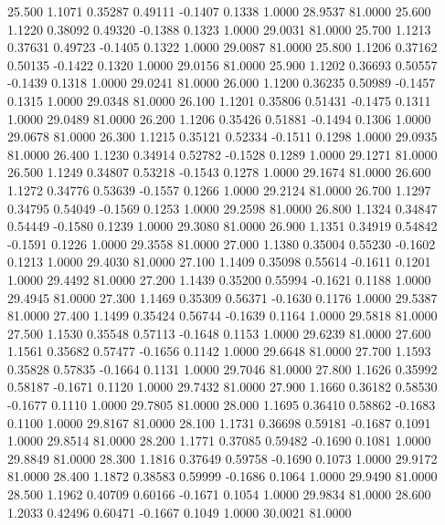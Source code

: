   25.500   1.1071   0.35287   0.49111  -0.1407   0.1338   1.0000  28.9537  81.0000
  25.600   1.1220   0.38092   0.49320  -0.1388   0.1323   1.0000  29.0031  81.0000
  25.700   1.1213   0.37631   0.49723  -0.1405   0.1322   1.0000  29.0087  81.0000
  25.800   1.1206   0.37162   0.50135  -0.1422   0.1320   1.0000  29.0156  81.0000
  25.900   1.1202   0.36693   0.50557  -0.1439   0.1318   1.0000  29.0241  81.0000
  26.000   1.1200   0.36235   0.50989  -0.1457   0.1315   1.0000  29.0348  81.0000
  26.100   1.1201   0.35806   0.51431  -0.1475   0.1311   1.0000  29.0489  81.0000
  26.200   1.1206   0.35426   0.51881  -0.1494   0.1306   1.0000  29.0678  81.0000
  26.300   1.1215   0.35121   0.52334  -0.1511   0.1298   1.0000  29.0935  81.0000
  26.400   1.1230   0.34914   0.52782  -0.1528   0.1289   1.0000  29.1271  81.0000
  26.500   1.1249   0.34807   0.53218  -0.1543   0.1278   1.0000  29.1674  81.0000
  26.600   1.1272   0.34776   0.53639  -0.1557   0.1266   1.0000  29.2124  81.0000
  26.700   1.1297   0.34795   0.54049  -0.1569   0.1253   1.0000  29.2598  81.0000
  26.800   1.1324   0.34847   0.54449  -0.1580   0.1239   1.0000  29.3080  81.0000
  26.900   1.1351   0.34919   0.54842  -0.1591   0.1226   1.0000  29.3558  81.0000
  27.000   1.1380   0.35004   0.55230  -0.1602   0.1213   1.0000  29.4030  81.0000
  27.100   1.1409   0.35098   0.55614  -0.1611   0.1201   1.0000  29.4492  81.0000
  27.200   1.1439   0.35200   0.55994  -0.1621   0.1188   1.0000  29.4945  81.0000
  27.300   1.1469   0.35309   0.56371  -0.1630   0.1176   1.0000  29.5387  81.0000
  27.400   1.1499   0.35424   0.56744  -0.1639   0.1164   1.0000  29.5818  81.0000
  27.500   1.1530   0.35548   0.57113  -0.1648   0.1153   1.0000  29.6239  81.0000
  27.600   1.1561   0.35682   0.57477  -0.1656   0.1142   1.0000  29.6648  81.0000
  27.700   1.1593   0.35828   0.57835  -0.1664   0.1131   1.0000  29.7046  81.0000
  27.800   1.1626   0.35992   0.58187  -0.1671   0.1120   1.0000  29.7432  81.0000
  27.900   1.1660   0.36182   0.58530  -0.1677   0.1110   1.0000  29.7805  81.0000
  28.000   1.1695   0.36410   0.58862  -0.1683   0.1100   1.0000  29.8167  81.0000
  28.100   1.1731   0.36698   0.59181  -0.1687   0.1091   1.0000  29.8514  81.0000
  28.200   1.1771   0.37085   0.59482  -0.1690   0.1081   1.0000  29.8849  81.0000
  28.300   1.1816   0.37649   0.59758  -0.1690   0.1073   1.0000  29.9172  81.0000
  28.400   1.1872   0.38583   0.59999  -0.1686   0.1064   1.0000  29.9490  81.0000
  28.500   1.1962   0.40709   0.60166  -0.1671   0.1054   1.0000  29.9834  81.0000
  28.600   1.2033   0.42496   0.60471  -0.1667   0.1049   1.0000  30.0021  81.0000
